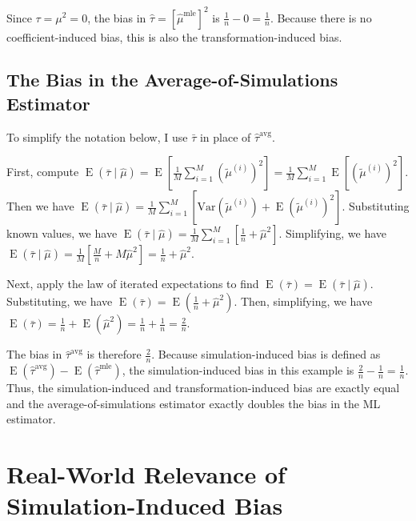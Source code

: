\documentclass[12pt]{article}
\DeclareMathOperator*{\E}{\text{E}}
\begin{document}
Since $\tau = \mu^2 = 0$, the bias in $\hat{\tau} = \left[ \hat{\mu}^\text{mle} \right]^2$ is $\frac{1}{n} - 0 = \frac{1}{n}$. Because there is no coefficient-induced bias, this is also the transformation-induced bias.

\subsection{The Bias in the Average-of-Simulations Estimator}

To simplify the notation below, I use $\bar{\tau}$ in place of $\hat{\tau}^\text{avg}$.

First, compute $\E(\bar{\tau} \mid \hat{\mu}) = \E\left[  \frac{1}{M} \sum_{i = 1}^M \left( \tilde{\mu}^{(i)} \right)^2 \right] = \frac{1}{M}  \sum_{i = 1}^M  \E\left[ \left( \tilde{\mu}^{(i)} \right)^2 \right]$. Then we have $\E(\bar{\tau} \mid \hat{\mu}) = \frac{1}{M}  \sum_{i = 1}^M \left[ \text{Var}(\tilde{\mu}^{(i)}) + \E\left( \tilde{\mu}^{(i)}\right)^2 \right]$. Substituting known values, we have $\E(\bar{\tau} \mid \hat{\mu}) = \frac{1}{M}  \sum_{i = 1}^M \left[ \frac{1}{n} + \hat{\mu}^2 \right]$. Simplifying, we have $\E(\bar{\tau} \mid \hat{\mu}) = \frac{1}{M}  \left[ \frac{M}{n} + M\hat{\mu}^2 \right] = \frac{1}{n} + \hat{\mu}^2$.

Next, apply the law of iterated expectations to find $\E(\bar{\tau}) = \E(\bar{\tau} \mid \hat{\mu})$. Substituting, we have $\E(\bar{\tau}) = \E(\frac{1}{n} + \hat{\mu}^2)$. Then, simplifying, we have $\E(\bar{\tau}) = \frac{1}{n} + \E(\hat{\mu}^2) = \frac{1}{n} + \frac{1}{n} = \frac{2}{n}$.

The bias in $\hat{\tau}^\text{avg}$ is therefore $\frac{2}{n}$. Because simulation-induced bias is defined as $\E\left(\hat{\tau}^\text{avg} \right) - \E\left(\hat{\tau}^\text{mle} \right)$, the simulation-induced bias in this example is $\frac{2}{n} - \frac{1}{n} = \frac{1}{n}$. Thus, the simulation-induced and transformation-induced bias are exactly equal and the average-of-simulations estimator exactly doubles the bias in the ML estimator.

\section{Real-World Relevance of Simulation-Induced Bias}\label{appendix:nagler}

\onehalfspace
\end{document}
